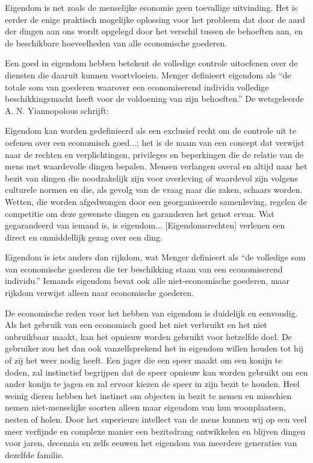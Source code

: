 \begin{blockquotebox}
    Eigendom is net zoals de menselijke economie geen toevallige uitvinding. Het is eerder de enige praktisch mogelijke oplossing voor het probleem dat door de aard der dingen aan ons wordt opgelegd door het verschil tussen de behoeften aan, en de beschikbare hoeveelheden van alle economische goederen.\footnotemark
\end{blockquotebox}


Een goed in eigendom hebben betekent de volledige controle uitoefenen over de diensten die daaruit kunnen voortvloeien. Menger definieert eigendom als \enquote{de totale som van goederen waarover een economiserend individu volledige beschikkingsmacht heeft voor de voldoening van zijn behoeften.}\autocite{49} De wetsgeleerde A. N. Yiannopolous schrijft:

\begin{blockquotebox}
    Eigendom kan worden gedefinieerd als een exclusief recht om de controle uit te oefenen over een economisch goed...; het is de naam van een concept dat verwijst naar de rechten en verplichtingen, privileges en beperkingen die de relatie van de mens met waardevolle dingen bepalen. Mensen verlangen overal en altijd naar het bezit van dingen die noodzakelijk zijn voor overleving of waardevol zijn volgens culturele normen en die, als gevolg van de vraag naar die zaken, schaars worden. Wetten, die worden afgedwongen door een georganiseerde samenleving, regelen de competitie om deze gewenste dingen en garanderen het genot ervan. Wat gegarandeerd van iemand is, is eigendom... [Eigendomsrechten] verlenen een direct en onmiddellijk gezag over een ding.\footnotemark
\end{blockquotebox}

Eigendom is iets anders dan rijkdom, wat Menger definieert als \enquote{de volledige som van economische goederen die ter beschikking staan van een economiserend individu.} \autocite{51} Iemands eigendom bevat ook alle niet-economische goederen, maar rijkdom verwijst alleen naar economische goederen.

De economische reden voor het hebben van eigendom is duidelijk en eenvoudig. Als het gebruik van een economisch goed het niet verbruikt en het niet onbruikbaar maakt, kan het opnieuw worden gebruikt voor hetzelfde doel. De gebruiker zou het dan ook vanzelfsprekend het in eigendom willen houden tot hij of zij het weer nodig heeft. Een jager die een speer maakt om een konijn te doden, zal instinctief begrijpen dat de speer opnieuw kan worden gebruikt om een ander konijn te jagen en zal ervoor kiezen de speer in zijn bezit te houden. Heel weinig dieren hebben het instinct om objecten in bezit te nemen en misschien nemen niet-menselijke soorten alleen maar eigendom van hun woonplaatsen, nesten of holen. Door het superieure intellect van de mens kunnen wij op een veel meer verfijnde en complexe manier een bezitsdrang ontwikkelen en blijven dingen voor jaren, decennia en zelfs eeuwen het eigendom van meerdere generaties van dezelfde familie.

